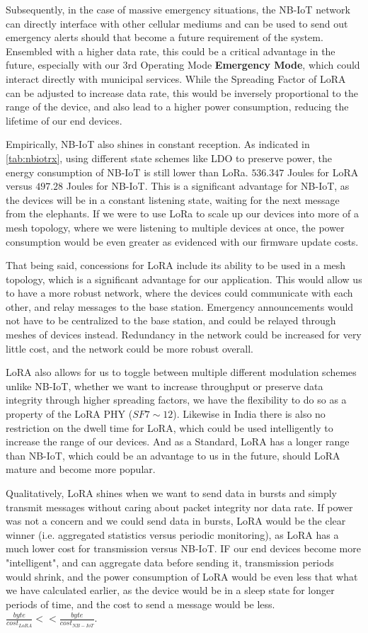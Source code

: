 Subsequently, in the case of massive emergency situations, the NB-IoT network can directly interface with other cellular mediums and can be used to send out emergency alerts should that become a future requirement of the system. Ensembled with a higher data rate, this could be a critical advantage in the future, especially with our 3rd Operating Mode \textbf{Emergency Mode}, which could interact directly with municipal services. While the Spreading Factor of LoRA can be adjusted to increase data rate, this would be inversely proportional to the range of the device, and also lead to a higher power consumption, reducing the lifetime of our end devices. 

Empirically, NB-IoT also shines in constant reception. As indicated in \ref{tab:nbiotrx}, using different state schemes like LDO to preserve power, the energy consumption of NB-IoT is still lower than LoRa. $536.347$ Joules for LoRA versus $497.28$ Joules for NB-IoT. This is a significant advantage for NB-IoT, as the devices will be in a constant listening state, waiting for the next message from the elephants. If we were to use LoRa to scale up our devices into more of a mesh topology, where we were listening to multiple devices at once, the power consumption would be even greater as evidenced with our firmware update costs. 

That being said, concessions for LoRA include its ability to be used in a mesh topology, which is a significant advantage for our application. This would allow us to have a more robust network, where the devices could communicate with each other, and relay messages to the base station. Emergency announcements would not have to be centralized to the base station, and could be relayed through meshes of devices instead. Redundancy in the network could be increased for very little cost, and the network could be more robust overall. 

LoRA also allows for us to toggle between multiple different modulation schemes unlike NB-IoT, whether we want to increase throughput or preserve data integrity through higher spreading factors, we have the flexibility to do so as a property of the LoRA PHY ($SF7\sim12$). Likewise in India there is also no restriction on the dwell time for LoRA, which could be used intelligently to increase the range of our devices. And as a Standard, LoRA has a longer range than NB-IoT, which could be an advantage to us in the future, should LoRA mature and become more popular. 

Qualitatively, LoRA shines when we want to send data in bursts and simply transmit messages without caring about packet integrity nor data rate. If power was not a concern and we could send data in bursts, LoRA would be the clear winner (i.e. aggregated statistics versus periodic monitoring), as LoRA has a much lower cost for transmission versus NB-IoT. IF our end devices become more "intelligent", and can aggregate data before sending it, transmission periods would shrink, and the power consumption of LoRA would be even less that what we have calculated earlier, as the device would be in a sleep state for longer periods of time, and the cost to send a message would be less. $\frac{byte}{cost_{LoRA}} << \frac{byte}{cost_{NB-IoT}}$.

